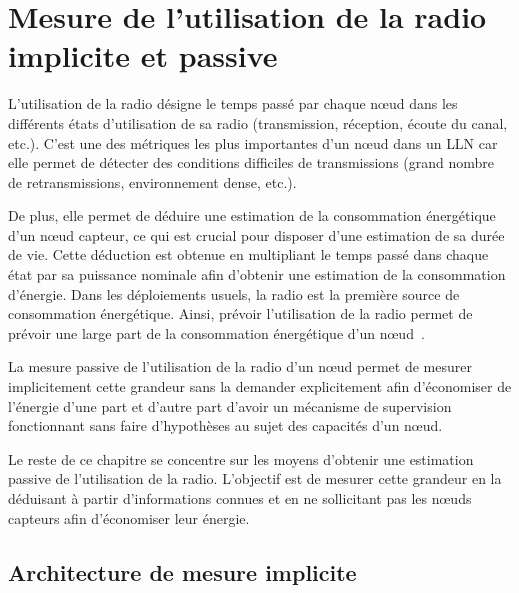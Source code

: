\section{Mesure de l'utilisation de la radio implicite et passive}
\label{supervision:model}

L'utilisation de la radio désigne le temps passé par chaque nœud dans les différents états d'utilisation de sa radio (transmission, réception, écoute du canal, etc.).
C'est une des métriques les plus importantes d'un nœud dans un \ac{LLN} car elle permet de détecter des conditions difficiles de transmissions (grand nombre de retransmissions, environnement dense, etc.).

De plus, elle permet de déduire une estimation de la consommation énergétique d'un nœud capteur, ce qui est crucial pour disposer d'une estimation de sa durée de vie.
Cette déduction est obtenue en multipliant le temps passé dans chaque état par sa puissance nominale afin d'obtenir une estimation de la consommation d'énergie.
Dans les déploiements usuels, la radio est la première source de consommation énergétique.
Ainsi, prévoir l'utilisation de la radio permet de prévoir une large part de la consommation énergétique d'un nœud~\cite{molina2010energy}.

La mesure passive de l'utilisation de la radio d'un nœud permet de mesurer implicitement cette grandeur sans la demander explicitement afin d'économiser de l'énergie d'une part et d'autre part d'avoir un mécanisme de supervision fonctionnant sans faire d'hypothèses au sujet des capacités d'un nœud.

Le reste de ce chapitre se concentre sur les moyens d'obtenir une estimation passive de l'utilisation de la radio.
L'objectif est de mesurer cette grandeur en la déduisant à partir d'informations connues et en ne sollicitant pas les nœuds capteurs afin d'économiser leur énergie.

\subsection{Architecture de mesure implicite}
\label{supervision:architecture}

